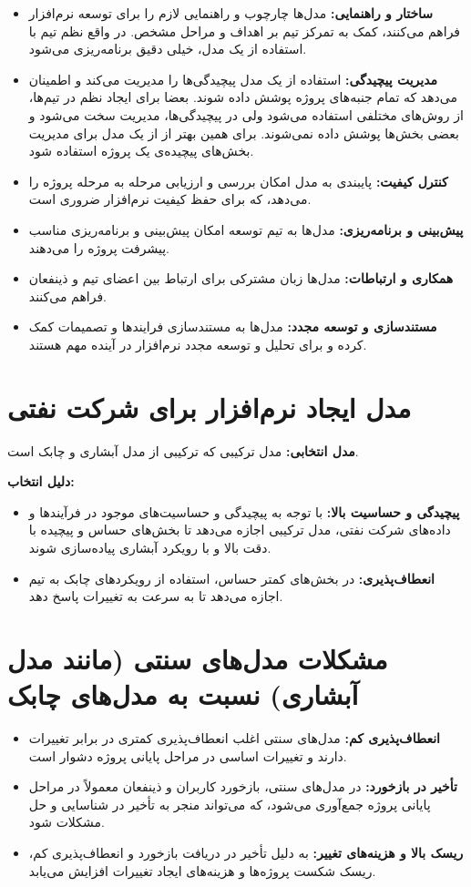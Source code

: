 \begin{itemize}
	\item \textbf{ساختار و راهنمایی:}
	مدل‌ها چارچوب و راهنمایی لازم را برای توسعه نرم‌افزار فراهم می‌کنند، کمک به تمرکز تیم بر اهداف و مراحل مشخص. در واقع نظم تیم با استفاده از یک مدل، خیلی دقیق برنامه‌ریزی می‌شود.
	\item \textbf{مدیریت پیچیدگی:}
	استفاده از یک مدل پیچیدگی‌ها را مدیریت می‌کند و اطمینان می‌دهد که تمام جنبه‌های پروژه پوشش داده شوند. بعضا برای ایجاد نظم در تیم‌ها، از روش‌های مختلفی استفاده می‌شود ولی در پیچیدگی‌ها، مدیریت سخت می‌شود و بعضی بخش‌ها پوشش داده نمی‌شوند. برای همین بهتر از از یک مدل برای مدیریت بخش‌های پیچیده‌ی یک پروژه استفاده شود.
	\item \textbf{کنترل کیفیت:}
	پایبندی به مدل امکان بررسی و ارزیابی مرحله به مرحله پروژه را می‌دهد، که برای حفظ کیفیت نرم‌افزار ضروری است.
	\item \textbf{پیش‌بینی و برنامه‌ریزی:}
	مدل‌ها به تیم توسعه امکان پیش‌بینی و برنامه‌ریزی مناسب پیشرفت پروژه را می‌دهند.
	\item \textbf{همکاری و ارتباطات:}
	مدل‌ها زبان مشترکی برای ارتباط بین اعضای تیم و ذینفعان فراهم می‌کنند.
	\item \textbf{مستندسازی و توسعه مجدد:}
	مدل‌ها به مستندسازی فرایندها و تصمیمات کمک کرده و برای تحلیل و توسعه مجدد نرم‌افزار در آینده مهم هستند.
\end{itemize}

\section*{ مدل ایجاد نرم‌افزار برای شرکت نفتی}
\textbf{مدل انتخابی:}
مدل ترکیبی
که ترکیبی از مدل آبشاری و چابک است.

\textbf{دلیل انتخاب:}

\begin{itemize}
	\item \textbf{پیچیدگی و حساسیت بالا:}
	 با توجه به پیچیدگی و حساسیت‌های موجود در فرآیندها و داده‌های شرکت نفتی، مدل ترکیبی اجازه می‌دهد تا بخش‌های حساس و پیچیده با دقت بالا و با رویکرد آبشاری پیاده‌سازی شوند.
	\item \textbf{انعطاف‌پذیری:}
	در بخش‌های کمتر حساس، استفاده از رویکردهای چابک به تیم اجازه می‌دهد تا به سرعت به تغییرات پاسخ دهد.
\end{itemize}

\section*{ مشکلات مدل‌های سنتی (مانند مدل آبشاری) نسبت به مدل‌های چابک}
\begin{itemize}
	\item \textbf{انعطاف‌پذیری کم:}
	مدل‌های سنتی اغلب انعطاف‌پذیری کمتری در برابر تغییرات دارند و تغییرات اساسی در مراحل پایانی پروژه دشوار است.
	\item \textbf{تأخیر در بازخورد:}
	در مدل‌های سنتی، بازخورد کاربران و ذینفعان معمولاً در مراحل پایانی پروژه جمع‌آوری می‌شود، که می‌تواند منجر به تأخیر در شناسایی و حل مشکلات شود.
	\item \textbf{ریسک بالا و هزینه‌های تغییر:}
	به دلیل تأخیر در دریافت بازخورد و انعطاف‌پذیری کم، ریسک شکست پروژه‌ها و هزینه‌های ایجاد تغییرات افزایش می‌یابد.
\end{itemize}